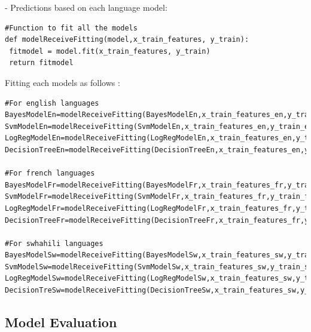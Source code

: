 \documentclass[12pt,a4paper, oneside]{book}
\begin{document}
- Predictions based on each language model: 
\begin{lstlisting}[style=stylejupyter]
#Function to fit all the models
def modelReceiveFitting(model,x_train_features, y_train):
 fitmodel = model.fit(x_train_features, y_train)
 return fitmodel
\end{lstlisting}
Fitting each models as follows :
 
\begin{lstlisting}[style=stylejupyter]
#For english languages
BayesModelEn=modelReceiveFitting(BayesModelEn,x_train_features_en,y_train_en) 
SvmModelEn=modelReceiveFitting(SvmModelEn,x_train_features_en,y_train_en) 
LogRegModelEn=modelReceiveFitting(LogRegModelEn,x_train_features_en,y_train_en) 
DecisionTreeEn=modelReceiveFitting(DecisionTreeEn,x_train_features_en,y_train_en) 

#For french languages
BayesModelFr=modelReceiveFitting(BayesModelFr,x_train_features_fr,y_train_fr)
SvmModelFr=modelReceiveFitting(SvmModelFr,x_train_features_fr,y_train_fr) 
LogRegModelFr=modelReceiveFitting(LogRegModelFr,x_train_features_fr,y_train_fr) 
DecisionTreeFr=modelReceiveFitting(DecisionTreeFr,x_train_features_fr,y_train_fr) 

#For swhahili languages
BayesModelSw=modelReceiveFitting(BayesModelSw,x_train_features_sw,y_train_sw)
SvmModelSw=modelReceiveFitting(SvmModelSw,x_train_features_sw,y_train_sw) 
LogRegModelSw=modelReceiveFitting(LogRegModelSw,x_train_features_sw,y_train_sw) 
DecisionTreSw=modelReceiveFitting(DecisionTreeSw,x_train_features_sw,y_train_sw)
\end{lstlisting}
\subsection{Model Evaluation}
\end{document}
